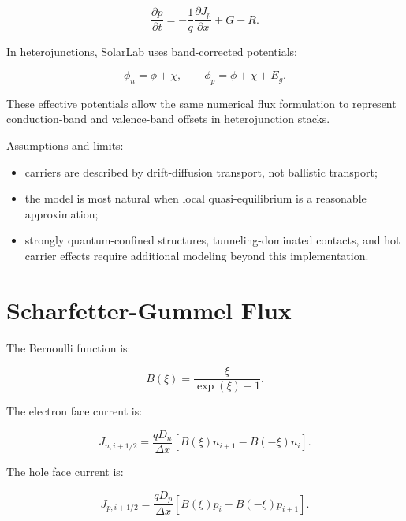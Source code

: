 \documentclass[
  11pt,
  american,
]{report}
\providecommand{\tightlist}{%
  \setlength{\itemsep}{0pt}\setlength{\parskip}{0pt}}
\begin{document}
\begin{equation}
\label{eq:hole-continuity}
\frac{\partial p}{\partial t}
=
-\frac{1}{q}\frac{\partial J_p}{\partial x}
+G-R .
\end{equation}

In heterojunctions, SolarLab uses band-corrected potentials:

\begin{equation}
\label{eq:band-corrected-potentials}
\phi_n=\phi+\chi, \qquad
\phi_p=\phi+\chi+E_g .
\end{equation}

These effective potentials allow the same numerical flux formulation to
represent conduction-band and valence-band offsets in heterojunction
stacks.

Assumptions and limits:

\begin{itemize}
\tightlist
\item
  carriers are described by drift-diffusion transport, not ballistic
  transport;
\item
  the model is most natural when local quasi-equilibrium is a reasonable
  approximation;
\item
  strongly quantum-confined structures, tunneling-dominated contacts,
  and hot carrier effects require additional modeling beyond this
  implementation.
\end{itemize}

\hypertarget{scharfetter-gummel-flux}{%
\section{Scharfetter-Gummel Flux}\label{scharfetter-gummel-flux}}

The Bernoulli function is:

\begin{equation}
\label{eq:bernoulli}
B(\xi)=\frac{\xi}{\exp(\xi)-1}.
\end{equation}

The electron face current is:

\begin{equation}
\label{eq:sg-electron}
J_{n,i+1/2}
=
\frac{qD_n}{\Delta x}
\left[
B(\xi)n_{i+1}-B(-\xi)n_i
\right].
\end{equation}

The hole face current is:

\begin{equation}
\label{eq:sg-hole}
J_{p,i+1/2}
=
\frac{qD_p}{\Delta x}
\left[
B(\xi)p_i-B(-\xi)p_{i+1}
\right].
\end{equation}
\end{document}
